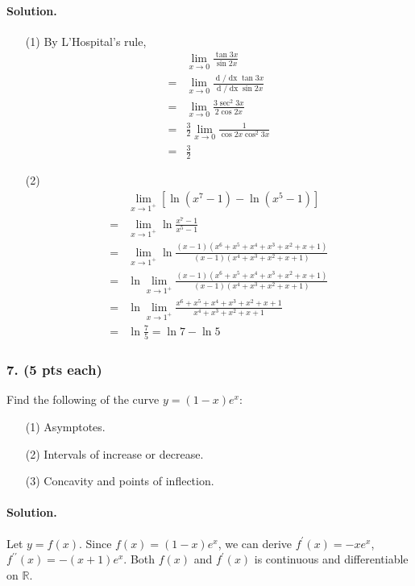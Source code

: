 \paragraph{Solution.}
\begin{itemize}
	\item [(1)]{
		By L'Hospital's rule,
		\begin{align*}
		&\lim_{x\rightarrow 0}\frac{\tan 3x}{\sin 2x}\\
		=& \lim_{x\rightarrow 0}\frac{{\mathop{d}/\mathop{dx}} \tan 3x}{{\mathop{d}/\mathop{dx}} \sin 2x}\\
		=& \lim_{x\rightarrow 0}\frac{3 \sec^2 3x}{2 \cos 2x}\\
		=& \frac{3}{2} \lim_{x\rightarrow 0}\frac{1}{\cos 2x \cos^2 3x}\\
		=& \frac{3}{2}
		\end{align*}
	}
	\item [(2)]{
		\begin{align*}
		&\lim_{x\rightarrow1^+}\left[\ln\left(x^7-1\right)-\ln\left(x^5-1\right)\right]\\
		=& \lim_{x\rightarrow1^+}\ln\frac{x^7-1}{x^5-1}\\
		=& \lim_{x\rightarrow1^+}\ln\frac{\left(x-1\right)\left(x^6+x^5+x^4+x^3+x^2+x+1\right)}{\left(x-1\right)\left(x^4+x^3+x^2+x+1\right)}\\
		=& \ln\lim_{x\rightarrow1^+}\frac{\left(x-1\right)\left(x^6+x^5+x^4+x^3+x^2+x+1\right)}{\left(x-1\right)\left(x^4+x^3+x^2+x+1\right)}\\
		=& \ln\lim_{x\rightarrow1^+}\frac{x^6+x^5+x^4+x^3+x^2+x+1}{x^4+x^3+x^2+x+1}\\
		=& \ln\frac{7}{5} = \ln 7 - \ln 5
		\end{align*}
	}
\end{itemize}

\subsubsection{7. (5 pts each)} Find the following of the curve $y=\left(1-x\right)e^x$:
\begin{itemize}
	\item [(1)] Asymptotes.
	\item [(2)] Intervals of increase or decrease.
	\item [(3)] Concavity and points of inflection.
\end{itemize}

\paragraph{Solution.} Let $y=f\left(x\right)$. Since $f\left(x\right)=\left(1-x\right)e^x$, we can derive $f^\prime\left(x\right)=-xe^x$, $f^{\prime\prime}\left(x\right)=-\left(x+1\right)e^x$. Both $f\left(x\right)$ and $f^\prime\left(x\right)$ is continuous and differentiable on $\mathbb{R}$.

